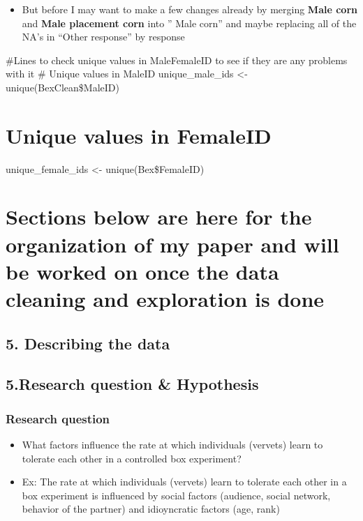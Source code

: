 \documentclass[
]{article}
\providecommand{\tightlist}{%
  \setlength{\itemsep}{0pt}\setlength{\parskip}{0pt}}
\begin{document}
\begin{itemize}
\tightlist
\item
  But before I may want to make a few changes already by merging
  \textbf{Male corn} and \textbf{Male placement corn} into '' Male
  corn'' and maybe replacing all of the NA's in ``Other response'' by
  response
\end{itemize}

\#Lines to check unique values in MaleFemaleID to see if they are any
problems with it \# Unique values in MaleID unique\_male\_ids \textless-
unique(BexClean\$MaleID)

\hypertarget{unique-values-in-femaleid}{%
\section{Unique values in FemaleID}\label{unique-values-in-femaleid}}

unique\_female\_ids \textless- unique(Bex\$FemaleID)

\hypertarget{sections-below-are-here-for-the-organization-of-my-paper-and-will-be-worked-on-once-the-data-cleaning-and-exploration-is-done}{%
\section{Sections below are here for the organization of my paper and
will be worked on once the data cleaning and exploration is
done}\label{sections-below-are-here-for-the-organization-of-my-paper-and-will-be-worked-on-once-the-data-cleaning-and-exploration-is-done}}

\hypertarget{describing-the-data}{%
\subsection{5. Describing the data}\label{describing-the-data}}

\hypertarget{research-question-hypothesis}{%
\subsection{5.Research question \&
Hypothesis}\label{research-question-hypothesis}}

\hypertarget{research-question}{%
\subsubsection{Research question}\label{research-question}}

\begin{itemize}
\item
  What factors influence the rate at which individuals (vervets) learn
  to tolerate each other in a controlled box experiment?
\item
  Ex: The rate at which individuals (vervets) learn to tolerate each
  other in a box experiment is influenced by social factors (audience,
  social network, behavior of the partner) and idioyncratic factors
  (age, rank)
\end{itemize}
\end{document}
